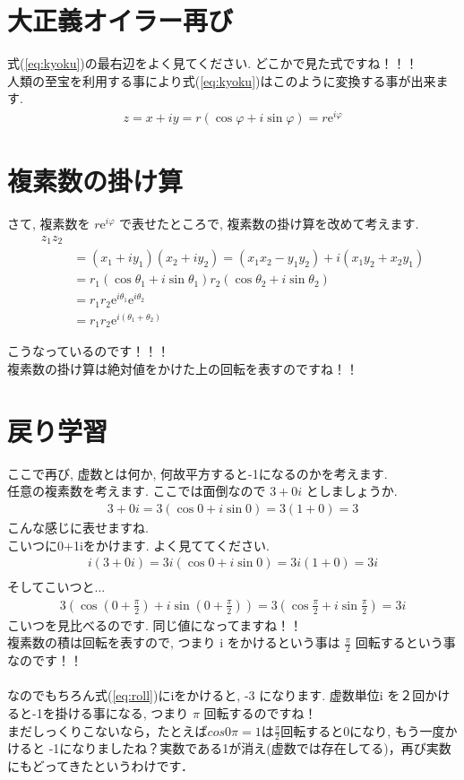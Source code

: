 \documentclass[11pt,a4paper,uplatex]{ujreport}
\begin{document}
\section{大正義オイラー再び}
式(\ref{eq:kyoku})の最右辺をよく見てください. どこかで見た式ですね！！！\\
人類の至宝を利用する事により式(\ref{eq:kyoku})はこのように変換する事が出来ます.\\
\begin{eqnarray}
z = x + iy = r(\cos\varphi + i\sin \varphi) = r \mathrm{e}^{i\varphi}
\end{eqnarray}

\section{複素数の掛け算}
さて, 複素数を $r\mathrm{e}^{i\varphi}$ で表せたところで, 複素数の掛け算を改めて考えます.\\
\begin{align}
z_1 z_2\\
& = (x_1 + iy_1)(x_2 + iy_2) = (x_1 x_2 - y_1 y_2) + i(x_1 y_2 +x_2 y_1)\\
&= r_1(\cos\theta_1 + i\sin\theta_1)r_2(\cos\theta_2 + i\sin\theta_2)\\
&= r_1r_2\mathrm{e}^{i\theta_1} \mathrm{e}^{i\theta_2}\\
&= r_1r_2\mathrm{e}^{i(\theta_1 + \theta_2)}
\end{align}

こうなっているのです！！！\\
複素数の掛け算は絶対値をかけた上の回転を表すのですね！！
\section{戻り学習}
ここで再び, 虚数とは何か, 何故平方すると-1になるのかを考えます.\\
任意の複素数を考えます. ここでは面倒なので $ 3 + 0i$ としましょうか.
\begin{eqnarray}
3 + 0i = 3(\cos 0 + i\sin 0) = 3(1 + 0) = 3
\end{eqnarray}
こんな感じに表せますね.\\
こいつに0+1iをかけます. よく見ててください.
\begin{eqnarray}
i(3 + 0i) = 3i(\cos 0 + i\sin 0) = 3i(1+0) = 3i\\
\end{eqnarray}
そしてこいつと...
\begin{eqnarray}
3(\cos (0+\frac{\pi}{2}) + i\sin (0 + \frac{\pi}{2})) = 3(\cos\frac{\pi}{2} + i\sin\frac{\pi}{2}) = 3i
\label{eq:roll}
\end{eqnarray}
こいつを見比べるのです. 同じ値になってますね！！\\
複素数の積は回転を表すので, つまり i をかけるという事は $\frac{\pi}{2}$ 回転するという事なのです！！\\
\\
なのでもちろん式(\ref{eq:roll})にiをかけると, -3 になります. 虚数単位i を２回かけると-1を掛ける事になる, つまり $\pi$ 回転するのですね！\\
まだしっくりこないなら，たとえば$cos0\pi = 1$は$\frac{\pi}{2}$回転すると0になり, もう一度かけると -1になりましたね？実数である1が消え(虚数では存在してる)，再び実数にもどってきたというわけです．
\end{document}
